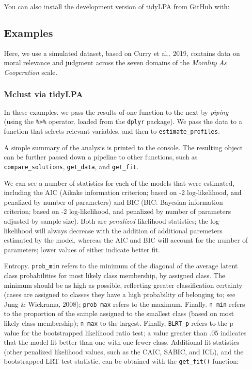\documentclass[
  english,
  man]{apa6}
\begin{document}
You can also install the development version of tidyLPA from GitHub with:

\hypertarget{examples}{%
\subsection{Examples}\label{examples}}

Here, we use a simulated dataset, based on Curry et al., 2019, contains data on moral relevance and judgment across the seven domains of the \emph{Morality As Cooperation} scale.

\hypertarget{mclust-via-tidylpa}{%
\subsubsection{Mclust via tidyLPA}\label{mclust-via-tidylpa}}

In these examples, we pass the results of one function to the next by \emph{piping}
(using the \texttt{\%\textgreater{}\%} operator, loaded from the \texttt{dplyr} package). We pass the data to
a function that selects relevant variables, and then to \texttt{estimate\_profiles}.

A simple summary of the analysis is printed to the console.
The resulting object can be further passed down a pipeline to
other functions, such as \texttt{compare\_solutions}, \texttt{get\_data}, and \texttt{get\_fit}.

We can see a number of statistics for each of the models that were estimated, including the
AIC (Aikake information criterion; based on -2 log-likelihood, and penalized by number of parameters) and BIC (BIC: Bayesian information criterion; based on -2 log-likelihood, and penalized by number of parameters adjusted by sample size). Both are \emph{penalized} likelihood statistics; the log-likelihood will always decrease with the addition of additional
paremeters estimated by the model, whereas the AIC and BIC will account for the number of parameters; lower values of
either indicate better fit.

Entropy. \texttt{prob\_min} refers to the minimum of the diagonal of the average latent class probabilities for most likely class membership, by assigned class. The minimum should be as high as possible, reflecting greater classification certainty (cases are assigned to classes they have a high probability of belonging to; see Jung \& Wickrama, 2008); \texttt{prob\_max}
refers to the maximum. Finally. \texttt{n\_min} refers to the proportion of the sample assigned to the smallest class (based on most likely class membership); \texttt{n\_max} to the largest. Finally, \texttt{BLRT\_p} refers to the p-value for the bootstrapped likelihood ratio test; a value greater than .05 indicates that the model fit better than one with one fewer class.
Additional fit statistics (other penalized likelihood values, such as the CAIC, SABIC, and ICL), and the bootstrapped LRT
test statistic, can be obtained with the \texttt{get\_fit()} function:
\end{document}
